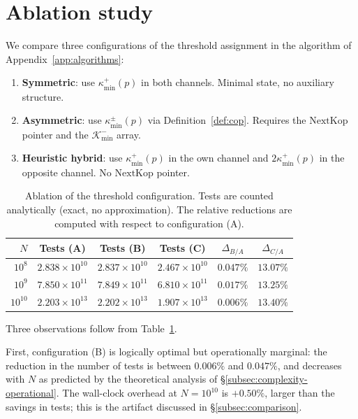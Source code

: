 \documentclass[11pt]{amsart}
\numberwithin{equation}{section}
\newcommand{\cK}{\mathcal{K}}
\newcommand{\kmin}{\kappa_{\min}}
\newcommand{\kminp}{\kappa_{\min}^{+}}
\newcommand{\NextKop}{\mathrm{NextKop}}
\theoremstyle{plain}
\theoremstyle{definition}
\begin{document}
\section{Ablation study}
\label{app:ablation}

We compare three configurations of the threshold assignment in the
algorithm of Appendix~\ref{app:algorithms}:
\begin{enumerate}
\item[(A)] \textbf{Symmetric}: use $\kminp(p)$ in both channels.
  Minimal state, no auxiliary structure.
\item[(B)] \textbf{Asymmetric}: use $\kmin^\pm(p)$ via
  Definition~\ref{def:cop}. Requires the $\NextKop$ pointer and the
  $\cK_{\min}^-$ array.
\item[(C)] \textbf{Heuristic hybrid}: use $\kminp(p)$ in the own
  channel and $2\kminp(p)$ in the opposite channel. No $\NextKop$
  pointer.
\end{enumerate}

\begin{table}[htbp]
\centering
\small
\caption{Ablation of the threshold configuration. Tests are counted
analytically (exact, no approximation). The relative reductions are
computed with respect to configuration (A).}
\label{tab:ablation}
\begin{tabular}{rccc|cc}
\toprule
$N$ & Tests (A) & Tests (B) & Tests (C) & $\Delta_{B/A}$ & $\Delta_{C/A}$ \\
\midrule
$10^8$ & $2.838\times 10^{10}$ & $2.837\times 10^{10}$ & $2.467\times 10^{10}$ & $0.047\%$ & $13.07\%$ \\
$10^9$ & $7.850\times 10^{11}$ & $7.849\times 10^{11}$ & $6.810\times 10^{11}$ & $0.017\%$ & $13.25\%$ \\
$10^{10}$ & $2.203\times 10^{13}$ & $2.202\times 10^{13}$ & $1.907\times 10^{13}$ & $0.006\%$ & $13.40\%$ \\
\bottomrule
\end{tabular}
\end{table}

Three observations follow from Table~\ref{tab:ablation}.

First, configuration (B) is logically optimal but operationally
marginal: the reduction in the number of tests is between $0.006\%$
and $0.047\%$, and decreases with $N$ as predicted by the theoretical
analysis of \S\ref{subsec:complexity-operational}. The wall-clock
overhead at $N=10^{10}$ is $+0.50\%$, larger than the savings in
tests; this is the artifact discussed in \S\ref{subsec:comparison}.
\end{document}
